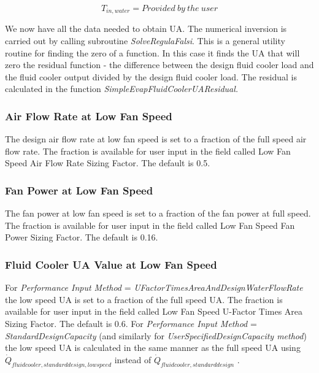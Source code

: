 \begin{equation}
{T_{in,water}} = Provided~by~the~user
\end{equation}

We now have all the data needed to obtain UA. The numerical inversion is carried out by calling subroutine \emph{SolveRegulaFalsi}. This is a general utility routine for finding the zero of a function. In this case it finds the UA that will zero the residual function - the difference between the design fluid cooler load and the fluid cooler output divided by the design fluid cooler load. The residual is calculated in the function \emph{SimpleEvapFluidCoolerUAResidual.}

\subsubsection{Air Flow Rate at Low Fan Speed}\label{air-flow-rate-at-low-fan-speed-2}

The design air flow rate at low fan speed is set to a fraction of the full speed air flow rate. The fraction is available for user input in the field called Low Fan Speed Air Flow Rate Sizing Factor. The default is 0.5.

\subsubsection{Fan Power at Low Fan Speed}\label{fan-power-at-low-fan-speed-2}

The fan power at low fan speed is set to a fraction of the fan power at full speed. The fraction is available for user input in the field called Low Fan Speed Fan Power Sizing Factor. The default is 0.16.

\subsubsection{Fluid Cooler UA Value at Low Fan Speed}\label{fluid-cooler-ua-value-at-low-fan-speed-1}

For \emph{Performance Input Method} = \emph{UFactorTimesAreaAndDesignWaterFlowRate} the low speed UA is set to a fraction of the full speed UA. The fraction is available for user input in the field called Low Fan Speed U-Factor Times Area Sizing Factor. The default is 0.6. For \emph{Performance Input Method} = \emph{StandardDesignCapacity} (and similarly for \emph{UserSpecifiedDesignCapacity method}) the low speed UA is calculated in the same manner as the full speed UA using \({\dot Q_{fluidcooler,standarddesign,lowspeed}}\) instead of \({\dot Q_{fluidcooler,standarddesign}}\) .

